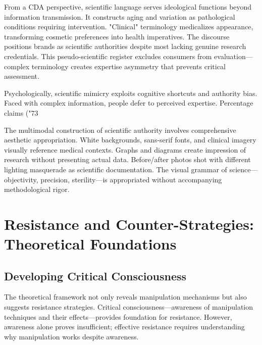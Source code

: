 From a CDA perspective, scientific language serves ideological functions beyond information transmission. It constructs aging and variation as pathological conditions requiring intervention. "Clinical" terminology medicalizes appearance, transforming cosmetic preferences into health imperatives. The discourse positions brands as scientific authorities despite most lacking genuine research credentials. This pseudo-scientific register excludes consumers from evaluation—complex terminology creates expertise asymmetry that prevents critical assessment.

Psychologically, scientific mimicry exploits cognitive shortcuts and authority bias. Faced with complex information, people defer to perceived expertise. Percentage claims ("73%

The multimodal construction of scientific authority involves comprehensive aesthetic appropriation. White backgrounds, sans-serif fonts, and clinical imagery visually reference medical contexts. Graphs and diagrams create impression of research without presenting actual data. Before/after photos shot with different lighting masquerade as scientific documentation. The visual grammar of science—objectivity, precision, sterility—is appropriated without accompanying methodological rigor.

\section{Resistance and Counter-Strategies: Theoretical Foundations}
\label{sec:resistance}

\subsection{Developing Critical Consciousness}

The theoretical framework not only reveals manipulation mechanisms but also suggests resistance strategies. Critical consciousness—awareness of manipulation techniques and their effects—provides foundation for resistance. However, awareness alone proves insufficient; effective resistance requires understanding why manipulation works despite awareness.

